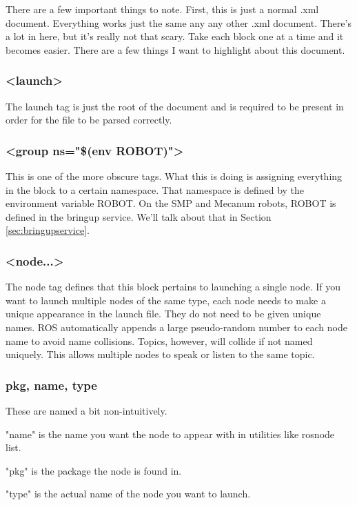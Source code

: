 There are a few important things to note. First, this is just a normal .xml document. Everything works just the same any any other .xml document. There's a lot in here, but it's really not that scary. Take each block one at a time and it becomes easier. There are a few things I want to highlight about this document.

\subsubsection{<launch>}

The launch tag is just the root of the document and is required to be present in order for the file to be parsed correctly. 

\subsubsection{<group ns="\$(env ROBOT)">}

This is one of the more obscure tags. What this is doing is assigning everything in the block to a certain namespace. That namespace is defined by the environment variable ROBOT. On the SMP and Mecanum robots, ROBOT is defined in the bringup service. We'll talk about that in Section \ref{sec:bringupservice}.

\subsubsection{<node...>}

The node tag defines that this block pertains to launching a single node. If you want to launch multiple nodes of the same type, each node needs to make a unique appearance in the launch file. They do not need to be given unique names. ROS automatically appends a large pseudo-random number to each node name to avoid name collisions. Topics, however, will collide if not named uniquely. This allows multiple nodes to speak or listen to the same topic.

\subsubsection{pkg, name, type}

These are named a bit non-intuitively.

"name" is the name you want the node to appear with in utilities like rosnode list.
 
"pkg" is the package the node is found in.
 
"type" is the actual name of the node you want to launch.
 
